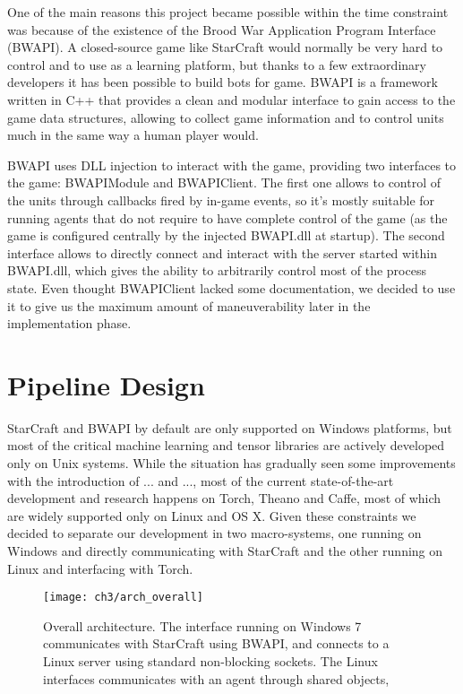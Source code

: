 One of the main reasons this project became possible within the time constraint
was because of the existence of the Brood War Application Program Interface
(BWAPI). A closed-source game like StarCraft would normally be very hard to
control and to use as a learning platform, but thanks to a few extraordinary
developers it has been possible to build bots for game. BWAPI is a framework
written in C++ that provides a clean and modular interface to gain access to the
game data structures, allowing to collect game information and to control units
much in the same way a human player would.

BWAPI uses DLL injection to interact with the game, providing two interfaces to
the game: BWAPIModule and BWAPIClient. The first one allows to control of the
units through callbacks fired 
by in-game events, so it's mostly suitable
for running agents that do not require to have complete control of the game (as
the game is configured centrally by the injected BWAPI.dll at startup). The
second interface allows to directly connect and interact with the server started
within BWAPI.dll, which gives the ability to arbitrarily control most of the
process state.
Even thought BWAPIClient lacked some documentation, we decided to use it to give
us the maximum amount of maneuverability later in the implementation phase.

\section{Pipeline Design} %

StarCraft and BWAPI by default are only supported on Windows platforms, but most
of the critical machine learning and tensor libraries are actively developed
only on Unix systems. While the situation has gradually seen some improvements
with the introduction of ... and ..., most of the current state-of-the-art
development and research happens on Torch, Theano and Caffe, most of which are
widely supported only on Linux and OS X. Given these constraints we decided to
separate our development in two macro-systems, one running on Windows and
directly communicating with StarCraft and the other running on Linux and
interfacing with Torch.

\begin{figure}[h]
    \centering
    \texttt{[image: ch3/arch\_overall]}
    \caption{Overall architecture. The interface running on Windows 7
      communicates with StarCraft using BWAPI, and connects to a Linux server
      using standard non-blocking sockets. The Linux interfaces communicates
      with an agent through shared objects, }
    \label{fig:arch_ov}
\end{figure}

